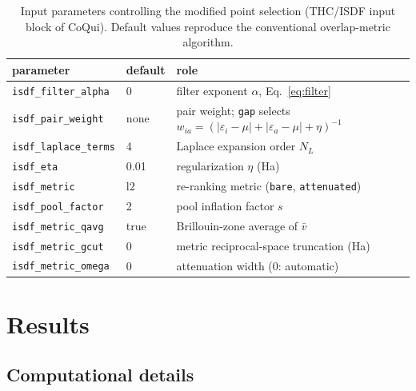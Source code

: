 \documentclass[aps,prb,twocolumn,superscriptaddress,amsmath,amssymb]{revtex4-2}
\begin{document}
\begin{table}
\caption{\label{tab:options}Input parameters controlling the modified point
selection (THC/ISDF input block of CoQui). Default values reproduce the
conventional overlap-metric algorithm.}
\begin{ruledtabular}
\begin{tabular}{llp{3.6cm}}
parameter & default & role \\
\hline
\texttt{isdf\_filter\_alpha} & 0 & filter exponent $\alpha$, Eq.~\eqref{eq:filter} \\
\texttt{isdf\_pair\_weight} & none & pair weight; \texttt{gap} selects
  $w_{ia}=(|\varepsilon_i{-}\mu|{+}|\varepsilon_a{-}\mu|{+}\eta)^{-1}$ \\
\texttt{isdf\_laplace\_terms} & 4 & Laplace expansion order $N_L$ \\
\texttt{isdf\_eta} & 0.01 & regularization $\eta$ (Ha) \\
\texttt{isdf\_metric} & l2 & re-ranking metric (\texttt{bare}, \texttt{attenuated}) \\
\texttt{isdf\_pool\_factor} & 2 & pool inflation factor $s$ \\
\texttt{isdf\_metric\_qavg} & true & Brillouin-zone average of $\bar v$ \\
\texttt{isdf\_metric\_gcut} & 0 & metric reciprocal-space truncation (Ha) \\
\texttt{isdf\_metric\_omega} & 0 & attenuation width (0: automatic) \\
\end{tabular}
\end{ruledtabular}
\end{table}

\section{Results}
\label{sec:results}

\subsection{Computational details}
\label{sec:compdetails}
\end{document}

